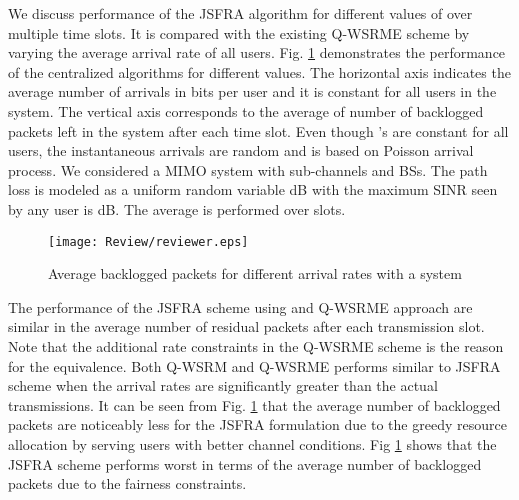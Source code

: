 
We discuss performance of the \ac{JSFRA} algorithm for different values of  over multiple time slots. It is compared with the existing \ac{Q-WSRME} scheme by varying the average arrival rate  of all users. Fig. \ref{fig-review} demonstrates the performance of the centralized algorithms for different  values. The horizontal axis indicates the average number of arrivals  in bits per user and it is constant for all users in the system. The vertical axis corresponds to the average of number of backlogged packets left in the system after each time slot. Even though 's are constant for all users, the instantaneous arrivals are random and is based on Poisson arrival process. We considered a  \ac{MIMO} system with  sub-channels and  \acp{BS}. The path loss is modeled as a uniform random variable \me{[0,-3]} dB with the maximum \ac{SINR} seen by any user is  dB. The average is performed over  slots.
\begin{figure}
\centering
\texttt{[image: Review/reviewer.eps]}
\label{fig-review}
\caption{Average backlogged packets for different arrival rates with a system }
\end{figure}

The performance of the \ac{JSFRA} scheme using  and \ac{Q-WSRME} approach are similar in the average number of residual packets after each transmission slot. Note that the additional rate constraints in the \ac{Q-WSRME} scheme is the reason for the equivalence. Both \ac{Q-WSRM} and \ac{Q-WSRME} performs similar to  \ac{JSFRA} scheme when the arrival rates are significantly greater than the actual transmissions. It can be seen from Fig. \ref{fig-review} that the average number of backlogged packets are noticeably less for the  \ac{JSFRA} formulation due to the greedy resource allocation by serving users with better channel conditions. Fig \ref{fig-review} shows that the \me{\ell_{\infty}} \ac{JSFRA} scheme performs worst in terms of the average number of backlogged packets due to the fairness constraints.